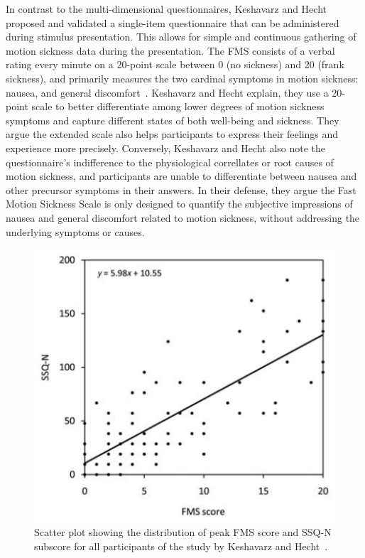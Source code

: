 In contrast to the multi-dimensional questionnaires, Keshavarz and Hecht~\cite{Keshavarz2011} proposed and validated
a single-item questionnaire that can be administered during stimulus presentation.
This allows for simple and continuous gathering of motion sickness data during the presentation.
The FMS consists of a verbal rating every minute on a 20-point scale between 0 (no sickness) and 20 (frank sickness),
and primarily measures the two cardinal symptoms in motion sickness: nausea, and general
discomfort~\cite{Keshavarz2011}.
Keshavarz and Hecht explain, they use a 20-point scale to better differentiate among lower
degrees of motion sickness symptoms and capture different states of both well-being and sickness.
They argue the extended scale also helps participants to express their feelings and experience more precisely.
Conversely, Keshavarz and Hecht also note the questionnaire's indifference to the physiological correllates or root
causes of motion sickness, and participants are unable to differentiate between nausea and other precursor symptoms
in their answers.
In their defense, they argue the Fast Motion Sickness Scale is only designed to quantify the subjective impressions
of nausea and general discomfort related to motion sickness, without addressing the underlying symptoms or causes.
\begin{figure}[h]
    \centering
    \includegraphics[width=\textwidth/2]{content/2_related_work/img/FMStoSSQcorrelation[Keshavarz2011]}
    \caption{Scatter plot showing the distribution of peak FMS score and SSQ-N subscore for all participants of the
    study by Keshavarz and Hecht~\cite{Keshavarz2011}.}
    \label{fig:fms-ssq-correlation}
\end{figure}
